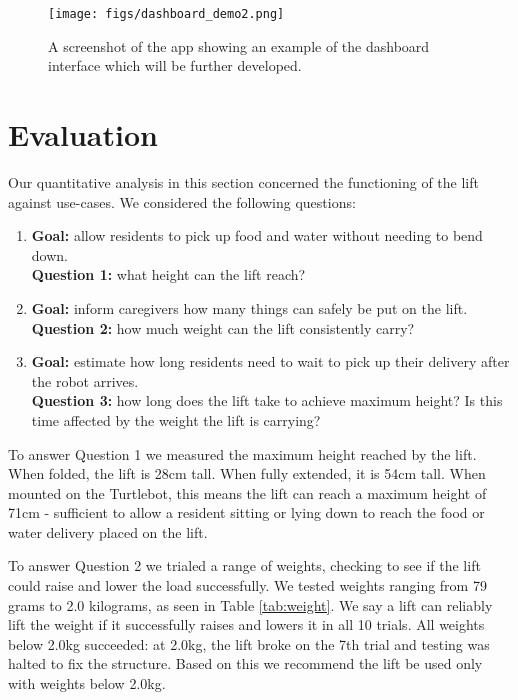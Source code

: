 \documentclass{article}
\begin{document}
\begin{figure}
  \begin{center}
    \texttt{[image: figs/dashboard\_demo2.png]}
    \caption{A screenshot of the app showing an example of the dashboard interface which will be further developed.}
  \label{fig:dashboard}
  \end{center}
\end{figure}


\section{Evaluation}
Our quantitative analysis in this section concerned the functioning of the lift against use-cases. We considered the following questions:
\begin{enumerate}
\item {\bf Goal:} allow residents to pick up food and water without needing to bend down. \\{\bf Question 1:} what height can the lift reach?
\item {\bf Goal:} inform caregivers how many things can safely be put on the lift. \\{\bf Question 2:} how much weight can the lift consistently carry?
\item {\bf Goal:} estimate how long residents need to wait to pick up their delivery after the robot arrives. \\{\bf Question 3:} how long does the lift take to achieve maximum height? Is this time affected by the weight the lift is carrying?
\end{enumerate}

To answer Question 1 we measured the maximum height reached by the lift. When folded, the lift is 28cm tall. When fully extended, it is 54cm tall. When mounted on the Turtlebot, this means the lift can reach a maximum height of 71cm - sufficient to allow a resident sitting or lying down to reach the food or water delivery placed on the lift.

To answer Question 2 we trialed a range of weights, checking to see if the lift could raise and lower the load successfully. We tested weights ranging from 79 grams to 2.0 kilograms, as seen in Table \ref{tab:weight}. We say a lift can reliably lift the weight if it successfully raises and lowers it in all 10 trials. All weights below 2.0kg succeeded: at 2.0kg, the lift broke on the 7th trial and testing was halted to fix the structure. Based on this we recommend the lift be used only with weights below 2.0kg.
\end{document}

